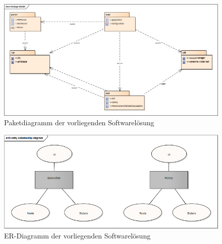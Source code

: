 \begin{appendices}
	\begin{figure}[h]
		\centering
		\includegraphics[width=\linewidth]{../../../01_uml/packageModel.png}
		\caption{Paketdiagramm der vorliegenden Softwarelösung}
		\label{packageDiagram}
	\end{figure}
	\begin{figure}[h]
		\centering
		\includegraphics[width=\linewidth]{../../../01_uml/erDiagram.png}
		\caption{ER-Diagramm der vorliegenden Softwarelösung}
		\label{erDiagram}
	\end{figure}
\end{appendices}